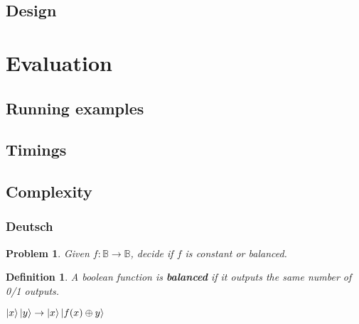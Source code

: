 \documentclass{beamer}
\newcommand{\Bool}{\ensuremath{\mathbb{B}}}
\newtheorem{defn}{Definition}
\newtheorem{prob}{Problem}
\begin{document}
\subsection[Design]{Design}


\section[Evaluation]{Evaluation}
\subsection[Running]{Running examples}
\subsection[Timings]{Timings}
\subsection[Complexity]{Complexity}

\begin{frame}

\frametitle{Deutsch}

  \begin{prob}
Given $f : \Bool\rightarrow\Bool$, decide if $f$ is 
\emph{constant} or \emph{balanced}.
  \end{prob}

\pause

\begin{defn}
  A boolean function is \textbf{balanced} if it outputs the same number of
  0/1 outputs.
\end{defn}

\pause

\vspace*{1cm}
$\ket{x}\ket{y} \rightarrow\ket{x}\ket{f(x)\oplus y}$
\end{frame}


\end{document}
